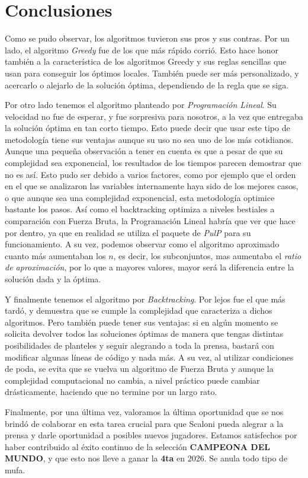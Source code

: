 \section{Conclusiones}

Como se pudo observar, los algoritmos tuvieron sus pros y sus contras. Por un lado, el algoritmo \textit{Greedy} fue de los que más rápido corrió. Esto hace honor también a la característica de los algoritmos Greedy y sus reglas sencillas que usan para conseguir los óptimos locales. También puede ser más personalizado, y acercarlo o alejarlo de la solución óptima, dependiendo de la regla que se siga.

Por otro lado tenemos el algoritmo planteado por \textit{Programación Lineal}. Su velocidad no fue de esperar, y fue sorpresiva para nosotros, a la vez que entregaba la solución óptima en tan corto tiempo. Esto puede decir que usar este tipo de metodología tiene sus ventajas aunque su uso no sea uno de los más cotidianos. Aunque una pequeña observación a tener en cuenta es que a pesar de que su complejidad sea exponencial, los resultados de los tiempos parecen demostrar que no es así. Esto pudo ser debido a varios factores, como por ejemplo que el orden en el que se analizaron las variables internamente haya sido de los mejores casos, o que aunque sea una complejidad exponencial, esta metodología optimice bastante los pasos. Así como el backtracking optimiza a niveles bestiales a comparación con Fuerza Bruta, la Programación Lineal habría que ver que hace por dentro, ya que en realidad se utiliza el paquete de \textit{PulP} para su funcionamiento. A su vez, podemos observar como el algoritmo aproximado cuanto más aumentaban los $n$, es decir, los subconjuntos, mas aumentaba el \textit{ratio de aproximación}, por lo que a mayores valores, mayor será la diferencia entre la solución dada y la óptima.

Y finalmente tenemos el algoritmo por \textit{Backtracking}. Por lejos fue el que más tardó, y demuestra que se cumple la complejidad que caracteriza a dichos algoritmos. Pero también puede tener sus ventajas: si en algún momento se solicita devolver todos las soluciones óptimas de manera que tengas distintas posibilidades de planteles y seguir alegrando a toda la prensa, bastará con modificar algunas líneas de código y nada más. A su vez, al utilizar condiciones de poda, se evita que se vuelva un algoritmo de Fuerza Bruta y aunque la complejidad computacional no cambia, a nivel práctico puede cambiar drásticamente, haciendo que no termine por un largo rato.

Finalmente, por una última vez, valoramos la última oportunidad que se nos brindó de colaborar en esta tarea crucial para que Scaloni pueda alegrar a la prensa y darle oportunidad a posibles nuevos jugadores. Estamos satisfechos por haber contribuido al éxito continuo de la selección \textbf{CAMPEONA DEL MUNDO}, y que esto nos lleve a ganar la \textbf{4ta} en 2026. Se anula todo tipo de mufa.